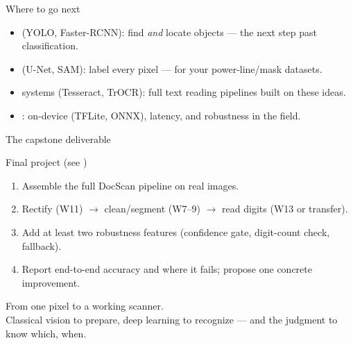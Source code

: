 \documentclass[10pt,aspectratio=169]{beamer}
\begin{document}
\begin{frame}{Where to go next}
  \begin{itemize}
    \item {} (YOLO, Faster-RCNN): find \emph{and} locate objects — the next step past classification.
    \item {} (U-Net, SAM): label every pixel — for your power-line/mask datasets.
    \item {} systems (Tesseract, TrOCR): full text reading pipelines built on these ideas.
    \item {}: on-device (TFLite, ONNX), latency, and robustness in the field.
  \end{itemize}
\end{frame}

\begin{frame}{The capstone deliverable}
  \begin{alertblock}{Final project (see )}
    \begin{enumerate}
      \item Assemble the full DocScan pipeline on real  images.
      \item Rectify (W11) $\rightarrow$ clean/segment (W7--9) $\rightarrow$ read digits (W13 or transfer).
      \item Add at least two robustness features (confidence gate, digit-count check, fallback).
      \item Report end-to-end accuracy and where it fails; propose one concrete improvement.
    \end{enumerate}
  \end{alertblock}
\end{frame}

\begin{frame}[standout]
  From one pixel to a working scanner.\\[4pt]
  \normalsize Classical vision to prepare, deep learning to recognize — and the judgment to know which, when.
\end{frame}
\end{document}
